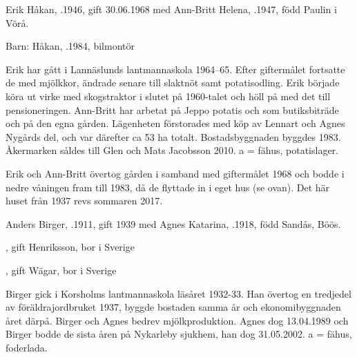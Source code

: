 
%
Erik Håkan, .1946, gift 30.06.1968 med Ann-Britt Helena, .1947, född Paulin i Vörå.

Barn:  Håkan, .1984, bilmontör

Erik har gått i Lannäslunds lantmannaskola 1964--65. Efter giftermålet fortsatte de med mjölkkor, ändrade senare till slaktnöt samt potatisodling. Erik började köra ut virke med skogstraktor i slutet på 1960-talet och höll på med det till pensioneringen. Ann-Britt har arbetat på Jeppo potatis och som butiksbiträde och på den egna gården. Lägenheten förstorades med köp av Lennart och Agnes Nygårds del, och var därefter ca 53 ha totalt. Bostadsbyggnaden byggdes 1983. Åkermarken såldes till Glen och Mats Jacobsson 2010. a = fähus, potatislager.



%



%
Erik och Ann-Britt övertog gården i samband med giftermålet 1968 och bodde i nedre våningen fram till 1983, då de flyttade in i eget hus (se ovan). Det här huset från 1937 revs sommaren 2017.\jhvspace{}

Anders Birger, .1911, gift 1939 med Agnes Katarina, .1918, född Sandås, Böös.
\begin{jhchildren}
  \item {}, gift Henriksson, bor i Sverige
  \item {}, gift Wägar, bor i Sverige
  \item {}
\end{jhchildren}
Birger gick i Korsholms lantmannaskola läsåret 1932-33. Han övertog en tredjedel av föräldrajordbruket 1937, byggde bostaden samma år och ekonomibyggnaden året därpå. Birger och Agnes bedrev mjölkproduktion. Agnes dog 13.04.1989 och Birger bodde de sista åren på Nykarleby sjukhem, han dog 31.05.2002. a = fähus, foderlada.



